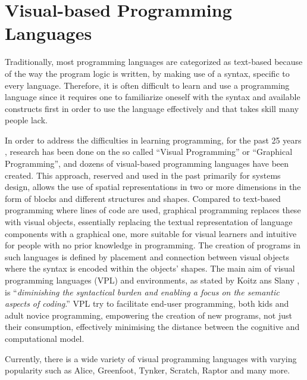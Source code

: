 \section{Visual-based Programming Languages}
\label{sec:visual_based_programming_languages}

Traditionally, most programming languages are categorized as text-based because of the way the program logic is written, by making use of a syntax, specific to every language. Therefore, it is often difficult to learn and use a programming language since it requires one to familiarize oneself with the syntax and available constructs first in order to use the language effectively and that takes skill many people lack. 

In order to address the difficulties in learning programming, for the past 25 years , research has been done on the so called “Visual Programming” or “Graphical Programming”, and dozens of visual-based programming languages have been created. This approach, reserved and used in the past primarily for systems design, allows the use of spatial representations in two or more dimensions in the form of blocks and different structures and shapes. Compared to text-based programming where lines of code are used, graphical programming replaces these with visual objects, essentially replacing the textual representation of language components with a graphical one, more suitable for visual learners and intuitive for people with no prior knowledge in programming. The creation of programs in such languages is defined by placement and connection between visual objects where the syntax is encoded within the objects' shapes.  
The main aim of visual programming languages (VPL) and environments, as stated by Koitz ans Slany \cite{KoitzSlany14}, is “\textit{diminishing the syntactical burden and enabling a focus on the semantic aspects of coding}.” VPL try to facilitate end-user programming, both kids and adult novice programming, empowering the creation of new programs, not just their consumption, effectively minimising the distance between the cognitive and computational model.

Currently, there is a wide variety of visual programming languages with varying popularity such as Alice, Greenfoot, Tynker, Scratch, Raptor and many more.

